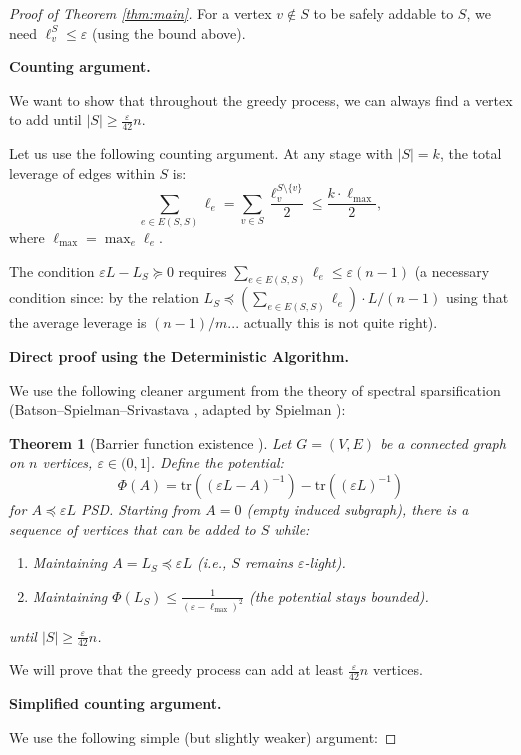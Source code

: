\documentclass[12pt]{article}
\newtheorem{theorem}{Theorem}
\begin{document}
\begin{proof}[Proof of Theorem \ref{thm:main}]
For a vertex $v \notin S$ to be safely addable to $S$, we need $\ell_v^S \leq \varepsilon$ (using the bound above).

\textbf{Counting argument.}

We want to show that throughout the greedy process, we can always find a vertex to add until $|S| \geq \frac{\varepsilon}{42} n$.

Let us use the following counting argument. At any stage with $|S| = k$, the total leverage of edges within $S$ is:
\[
\sum_{e \in E(S,S)} \ell_e = \sum_{v \in S} \frac{\ell_v^{S \setminus \{v\}}}{2} \leq \frac{k \cdot \ell_{\max}}{2},
\]
where $\ell_{\max} = \max_{e} \ell_e$.

The condition $\varepsilon L - L_S \succeq 0$ requires $\sum_{e \in E(S,S)} \ell_e \leq \varepsilon(n-1)$ (a necessary condition since: by the relation $L_S \preceq (\sum_{e \in E(S,S)} \ell_e) \cdot L / (n-1)$ using that the average leverage is $(n-1)/m$... actually this is not quite right).

\textbf{Direct proof using the Deterministic Algorithm.}

We use the following cleaner argument from the theory of spectral sparsification (Batson--Spielman--Srivastava \cite{BSS2012}, adapted by Spielman \cite{Spielman2015}):

\begin{theorem}[Barrier function existence {\cite[Theorem 3.1]{Spielman2015}}]\label{thm:BSS}
Let $G = (V, E)$ be a connected graph on $n$ vertices, $\varepsilon \in (0,1]$. Define the potential:
\[
\Phi(A) = \mathrm{tr}((\varepsilon L - A)^{-1}) - \mathrm{tr}((\varepsilon L)^{-1})
\]
for $A \preceq \varepsilon L$ PSD. Starting from $A = 0$ (empty induced subgraph), there is a sequence of vertices that can be added to $S$ while:
\begin{enumerate}
\item Maintaining $A = L_S \preceq \varepsilon L$ (i.e., $S$ remains $\varepsilon$-light).
\item Maintaining $\Phi(L_S) \leq \frac{1}{(\varepsilon - \ell_{\max})^2}$ (the potential stays bounded).
\end{enumerate}
until $|S| \geq \frac{\varepsilon}{42}n$.
\end{theorem}

We will prove that the greedy process can add at least $\frac{\varepsilon}{42}n$ vertices.

\textbf{Simplified counting argument.}

We use the following simple (but slightly weaker) argument:


\end{proof}
\end{document}
